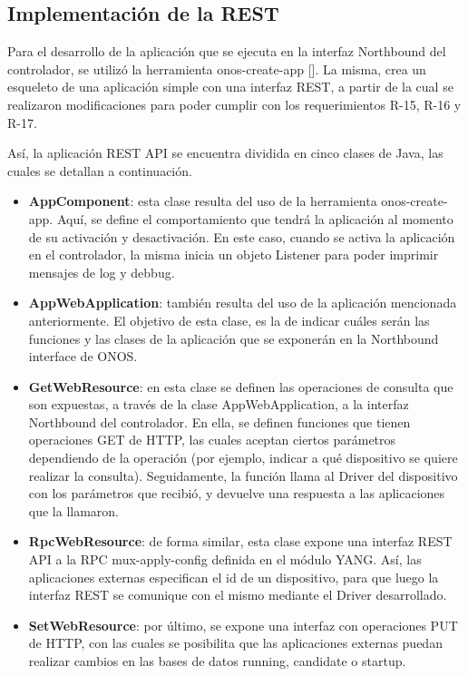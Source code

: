   \subsection{Implementación de la REST}

  Para el desarrollo de la aplicación que se ejecuta en la interfaz Northbound del controlador, se utilizó la herramienta onos-create-app []. La misma, crea un esqueleto de una aplicación simple con una interfaz REST, a partir de la cual se realizaron modificaciones para poder cumplir con los requerimientos R-15, R-16 y R-17.

  Así, la aplicación REST API se encuentra dividida en cinco clases de Java, las cuales se detallan a continuación. 


  \begin{itemize}
	\item \textbf{AppComponent}: esta clase resulta del uso de la herramienta onos-create-app. Aquí, se define el comportamiento que tendrá la aplicación al momento de su activación y desactivación. En este caso, cuando se activa la aplicación en el controlador, la misma inicia un objeto Listener para poder imprimir mensajes de log y debbug.
    
    \item \textbf{AppWebApplication}: también resulta del uso de la aplicación mencionada anteriormente. El objetivo de esta clase, es la de indicar cuáles serán las funciones y las clases de la aplicación que se exponerán en la Northbound interface de ONOS.

    \item \textbf{GetWebResource}: en esta clase se definen las operaciones de consulta que son expuestas, a través de la clase AppWebApplication, a la interfaz Northbound del controlador. En ella, se definen funciones que tienen operaciones GET de HTTP, las cuales aceptan ciertos parámetros dependiendo de la operación (por ejemplo, indicar a qué dispositivo se quiere realizar la consulta). Seguidamente, la función llama al Driver del dispositivo con los parámetros que recibió,  y devuelve una respuesta a las aplicaciones que la llamaron.
    
    \item \textbf{RpcWebResource}: de forma similar, esta clase expone una interfaz REST API a la RPC mux-apply-config definida en el módulo YANG. Así, las aplicaciones externas especifican el id de un dispositivo, para que luego la interfaz REST se comunique con el mismo mediante el Driver desarrollado. 
    
    \item \textbf{SetWebResource}: por último, se expone una interfaz con operaciones PUT de HTTP, con las cuales se posibilita que las aplicaciones externas puedan realizar cambios en las bases de datos running, candidate o startup.

\end{itemize}

